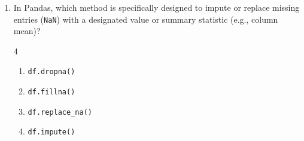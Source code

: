 \documentclass[11pt,a4paper]{article}
\begin{document}
\begin{enumerate}[leftmargin=*,itemsep=2.5pt,resume]
\item In Pandas, which method is specifically designed to impute or replace missing entries (\texttt{NaN}) with a designated value or summary statistic (e.g., column mean)?
\begin{multicols}{4}
\begin{enumerate}[label=\Alph*.]
  \item \texttt{df.dropna()}
  \item \texttt{df.fillna()}
  \item \texttt{df.replace\_na()}
  \item \texttt{df.impute()}
\end{enumerate}
\end{multicols}

\end{enumerate}
\end{document}
